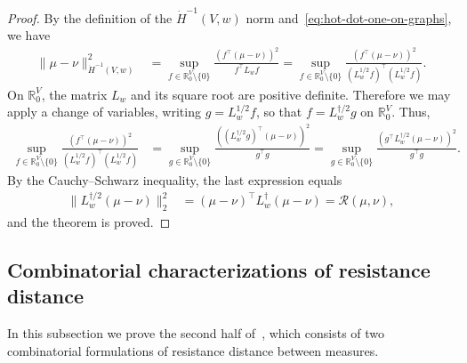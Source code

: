 \documentclass[11pt,a4paper]{article}
\newcommand{\Resis}{\mathcal{R}}
\begin{document}
\begin{proof}
    By the definition of the $\dot{H}^{-1}(V,w)$ norm and~\cref{eq:hot-dot-one-on-graphs}, we have
        \begin{align*}
            \|\mu - \nu\|_{\dot{H}^{-1}(V,w)}^2 &= \sup_{f\in\mathbb{R}^{V}_0\setminus\{0\}} \frac{(f^\top (\mu - \nu))^2}{f^\top L_w f} = \sup_{f\in\mathbb{R}^{V}_0\setminus\{0\}} \frac{(f^\top (\mu - \nu))^2}{(L_w^{1/2} f)^\top (L_w^{1/2} f)}.
        \end{align*}
    On $\mathbb{R}^{V}_0$, the matrix $L_w$ and its square root are positive definite. Therefore we may apply a change of variables, writing $g=L_w^{1/2} f$, so that $f = L_w^{\dagger/2} g$ on $\mathbb{R}^{V}_0$. Thus,
        \begin{align*}
            \sup_{f\in\mathbb{R}^{V}_0\setminus\{0\}} \frac{(f^\top (\mu - \nu))^2}{(L_w^{1/2} f)^\top (L_w^{1/2} f)} &= \sup_{g\in\mathbb{R}^{V}_0\setminus\{0\}} \frac{\left((L_w^{\dagger/2} g)^\top (\mu - \nu)\right)^2}{g^\top g} = \sup_{g\in\mathbb{R}^{V}_0\setminus\{0\}} \frac{\left(g^\top L_w^{\dagger/2} (\mu - \nu)\right)^2}{g^\top g}.
        \end{align*}
    By the Cauchy--Schwarz inequality, the last expression equals
        \begin{align*}
            \|L_w^{\dagger/2} (\mu - \nu)\|_2^2 &= (\mu - \nu)^\top L_w^{\dagger} (\mu - \nu) = \Resis(\mu,\nu),
        \end{align*}
    and the theorem is proved.
\end{proof}

\subsection{Combinatorial characterizations of resistance distance}\label{subsec:combinatorial-characterizations}

In this subsection we prove the second half of~, which consists of two combinatorial formulations of resistance distance between measures.
\end{document}
